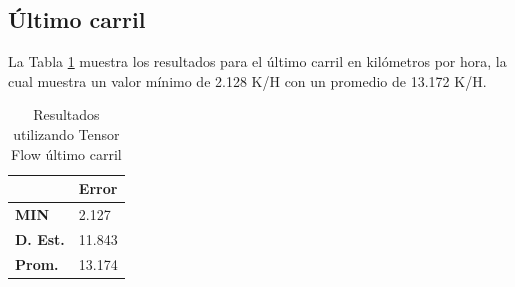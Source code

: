 \subsection{Último carril}

La Tabla \ref{tab:resultadosTFCUltimo} muestra los resultados para el último carril en kilómetros por hora, la cual muestra un valor mínimo de 2.128 K/H con un promedio de 13.172 K/H.

\begin{table}[H]
    \centering
    \caption{Resultados utilizando Tensor Flow último carril}
    \label{tab:resultadosTFCUltimo}
    \begin{tabular}{|l|l|}
    \hline
    \textbf{} & \textbf{Error} \\ \hline
    \textbf{MIN} & 2.127 \\ \hline
    \textbf{D. Est.} & 11.843 \\ \hline
    \textbf{Prom.} & 13.174 \\ \hline
    \end{tabular}
\end{table}
